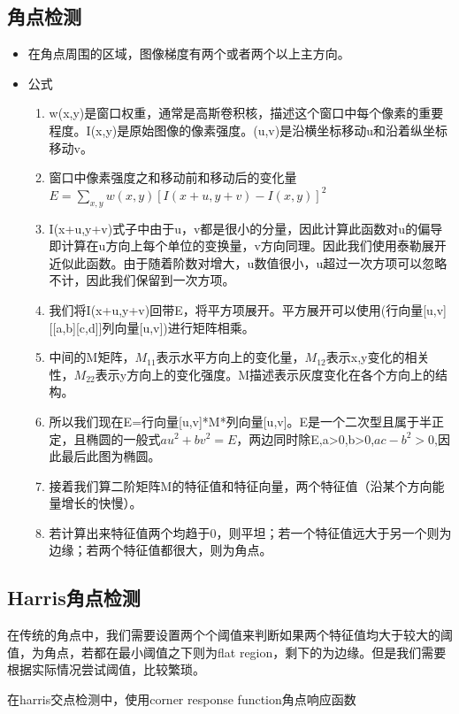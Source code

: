 \documentclass[UTF8]{ctexart}
\begin{document}
\subsection{角点检测}

\begin{itemize}
    \item 在角点周围的区域，图像梯度有两个或者两个以上主方向。
    \item 公式
    \begin{enumerate}
        \item w(x,y)是窗口权重，通常是高斯卷积核，描述这个窗口中每个像素的重要程度。I(x,y)是原始图像的像素强度。(u,v)是沿横坐标移动u和沿着纵坐标移动v。
        \item 窗口中像素强度之和移动前和移动后的变化量$E=\displaystyle{\sum_{x,y}w(x,y)[I(x+u,y+v)-I(x,y)]^2}$
        \item I(x+u,y+v)式子中由于u，v都是很小的分量，因此计算此函数对u的偏导即计算在u方向上每个单位的变换量，v方向同理。因此我们使用泰勒展开近似此函数。由于随着阶数对增大，u数值很小，u超过一次方项可以忽略不计，因此我们保留到一次方项。
        \item 我们将I(x+u,y+v)回带E，将平方项展开。平方展开可以使用(行向量[u,v][[a,b][c,d]]列向量[u,v])进行矩阵相乘。
        \item 中间的M矩阵，$M_{11}$表示水平方向上的变化量，$M_{12}$表示x,y变化的相关性，$M_{22}$表示y方向上的变化强度。M描述表示灰度变化在各个方向上的结构。
        \item 所以我们现在E=行向量[u,v]*M*列向量[u,v]。E是一个二次型且属于半正定，且椭圆的一般式$au^2+bv^2=E$，两边同时除E,a>0,b>0,$ac-b^2>0$,因此最后此图为椭圆。
        \item 接着我们算二阶矩阵M的特征值和特征向量，两个特征值（沿某个方向能量增长的快慢）。
        \item 若计算出来特征值两个均趋于0，则平坦；若一个特征值远大于另一个则为边缘；若两个特征值都很大，则为角点。
    \end{enumerate}
\end{itemize}

\subsection{Harris角点检测}
在传统的角点中，我们需要设置两个个阈值来判断如果两个特征值均大于较大的阈值，为角点，若都在最小阈值之下则为flat region，剩下的为边缘。但是我们需要根据实际情况尝试阈值，比较繁琐。

在harris交点检测中，使用corner response function角点响应函数
\end{document}
